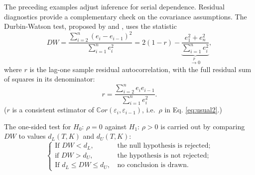 \documentclass[
  11pt,
]{book}
\theoremstyle{definition}
\theoremstyle{definition}
\theoremstyle{definition}
\theoremstyle{definition}
\theoremstyle{remark}
\begin{document}
The preceding examples adjust inference for serial dependence. Residual diagnostics provide a complementary check on the covariance assumptions. The Durbin-Watson test, proposed by \citet{Durbin_Watson_1950} and \citet{Durbin_Watson_1951}, uses the statistic
\[
DW = \frac{\sum_{i=2}^{n}(e_i - e_{i-1})^2}{\sum_{i=1}^{n}e_i^2}= 2(1 - r) - \underbrace{\frac{e_1^2 + e_n^2}{\sum_{i=1}^{n}e_i^2}}_{\overset{p}{\rightarrow} 0},
\]
where \(r\) is the lag-one sample residual autocorrelation, with the full residual sum of squares in its denominator:
\[
r = \frac{\sum_{i=2}^{n}e_i e_{i-1}}{\sum_{i=1}^{n}e_i^2}.
\]
(\(r\) is a consistent estimator of \(\mathbb{C}or(\varepsilon_i,\varepsilon_{i-1})\), i.e.~\(\rho\) in Eq. \eqref{eq:usual2}.)

The one-sided test for \(H_0\): \(\rho=0\) against \(H_1\): \(\rho>0\) is carried out by comparing \(DW\) to values \(d_L(T, K)\) and \(d_U(T, K)\):
\[
\left\{
\begin{array}{ll}
\mbox{If $DW < d_L$,}&\mbox{ the null hypothesis is rejected;}\\
\mbox{if $DW > d_U$,}&\mbox{ the hypothesis is not rejected;}\\
\mbox{If $d_L \le DW \le d_U$,} &\mbox{ no conclusion is drawn.}
\end{array}
\right.
\]
\end{document}
